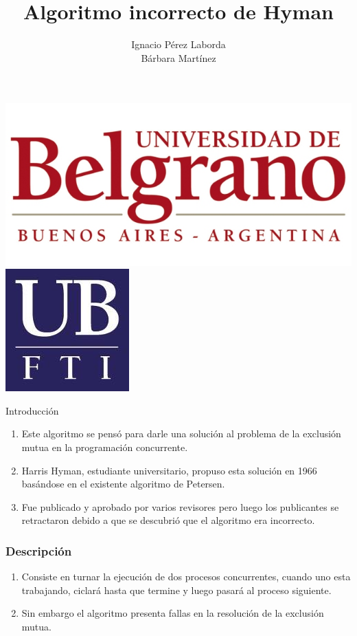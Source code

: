 \documentclass{beamer}
\title[Tecnologia]
{Algoritmo incorrecto de Hyman}
\subtitle{}
\author[Grupo 3] 
{Ignacio P\'erez Laborda\\B\'arbara Mart\'inez}
\institute[UB--FTI] 
{
  Facultad de Tecnolog\'ia Inform\'atica\\
  Universidad de Belgrano
}
\date[\today]
\begin{document}

\begin{frame}

\includegraphics[height=0.2\textheight]{ub2.jpg} \hspace*{6cm}
\includegraphics[height=0.19\textheight]{FTI.jpg}  
\\[-0.1cm]
\titlepage


\end{frame}

\begin{frame}{Introducción}
\begin{enumerate}
\item Este algoritmo se pensó para darle una solución al problema de la exclusión mutua en la 
programación concurrente.
\item Harris Hyman, estudiante universitario, propuso esta solución en 1966 basándose en el 
existente algoritmo de Petersen.
\item Fue publicado y aprobado por varios revisores pero luego los publicantes se retractaron debido a que se descubrió que el algoritmo era incorrecto.
\end{enumerate}

\end{frame}

\begin{frame}
\frametitle{Descripción} 
\begin{enumerate}[$*$]
\item Consiste en turnar la ejecución de dos procesos concurrentes, cuando uno esta trabajando, 
ciclará 
hasta que termine y luego pasará al proceso siguiente.
\item Sin embargo el algoritmo presenta fallas en la resolución de la exclusión mutua.
\end{enumerate}
\end{frame}
\end{document}
